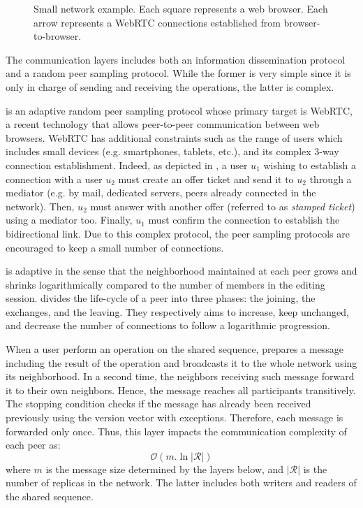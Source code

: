 \begin{asparadesc}

\begin{figure}
  \centering
  
  \caption{\label{fig:network}Small network example. Each square represents a
    web browser. Each arrow represents a WebRTC connections established from
    browser-to-browser. }
\end{figure}

\item [The communication layers] includes both an information dissemination
  protocol and a random peer sampling protocol. While the former is very simple
  since it is only in charge of sending and receiving the operations, the latter
  is complex.

  \SPRAY is an adaptive random peer sampling protocol whose primary target is
  WebRTC, a recent technology that allows peer-to-peer communication between web
  browsers. WebRTC has additional constraints such as the range of users which
  includes small devices (e.g. smartphones, tablets, etc.), and its complex
  3-way connection establishment. Indeed, as depicted in , a user
  $u_1$ wishing to establish a connection with a user $u_2$ must create an offer
  ticket and send it to $u_2$ through a mediator (e.g. by mail, dedicated
  servers, peers already connected in the network). Then, $u_2$ must answer with
  another offer (referred to as \emph{stamped ticket}) using a mediator
  too. Finally, $u_1$ must confirm the connection to establish the bidirectional
  link. Due to this complex protocol, the peer sampling protocols are encouraged
  to keep a small number of connections.

  \SPRAY is adaptive in the sense that the neighborhood maintained at each peer
  grows and shrinks logarithmically compared to the number of members in the
  editing session. \SPRAY divides the life-cycle of a peer into three phases:
  the joining, the exchanges, and the leaving. They respectively aims to
  increase, keep unchanged, and decrease the number of connections to follow a
  logarithmic progression.
  
  When a user perform an operation on the shared sequence, \CRATE prepares a
  message including the result of the operation and broadcasts it to the whole
  network using its neighborhood. In a second time, the neighbors receiving such
  message forward it to their own neighbors. Hence, the message reaches all
  participants transitively. The stopping condition checks if the message has
  already been received previously using the version vector with
  exceptions. Therefore, each message is forwarded only once. Thus, this layer
  impacts the communication complexity of each peer as:
  \begin{equation}
    \mathcal{O}(m.\ln |\mathcal{R}| )
  \end{equation}
  where $m$ is the message size determined by the layers below, and
  $|\mathcal{R}|$ is the number of replicas in the network. The latter includes
  both writers and readers of the shared sequence.
  

\end{asparadesc}
